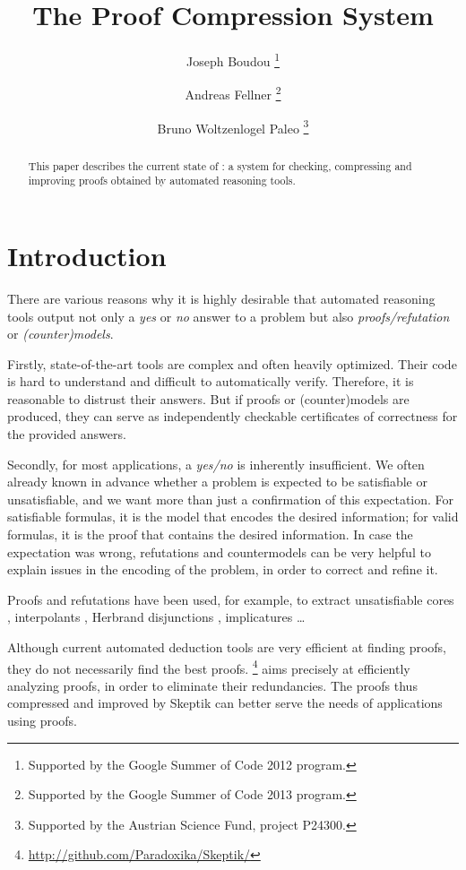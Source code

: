 \documentclass{llncs}
\title{The \skeptik Proof Compression System}
\author{
  Joseph Boudou\inst{1}
  \thanks{Supported by the Google Summer of Code 2012 program.}
  \and 
  Andreas Fellner\inst{2,3}
  \thanks{Supported by the Google Summer of Code 2013 program.}
  \and 
  Bruno Woltzenlogel Paleo\inst{3}
  \thanks{Supported by the Austrian Science Fund, project P24300.}
}
\institute{
  IRIT, Universit\'e de Toulouse, France \\
  \email{joseph.boudou@irit.fr}
  \and 
  Free University of Bolzano, Italy \\
  \email{fellner.a@gmail.com}
  \and 
  Vienna University of Technology, Austria \\
  \email{bruno@logic.at}
}
\begin{document}
\maketitle


\begin{abstract}
This paper describes the current state of \skeptik: a system for checking, compressing and improving proofs obtained by automated reasoning tools.
\end{abstract}

\setcounter{footnote}{0}


\section{Introduction}

There are various reasons why it is highly desirable 
that automated reasoning
tools output not only a \emph{yes} or \emph{no} answer to a problem 
but also \emph{proofs/refutation} or \emph{(counter)models}. 

Firstly, state-of-the-art tools are complex and often heavily optimized. 
Their code is hard to understand and difficult to automatically verify.
Therefore, it is reasonable to distrust their answers. 
But if proofs or (counter)models are produced, 
they can serve as independently checkable certificates of 
correctness for the provided answers. 

Secondly, for most applications, a \emph{yes/no} is inherently insufficient. We often already known in advance whether a problem is expected to be satisfiable or unsatisfiable, and we want more than just a confirmation of this expectation. For satisfiable formulas, it is the model that encodes the desired information; for valid formulas, it is the proof that contains the desired information. In case the expectation was wrong, refutations and countermodels can be very helpful to explain issues in the encoding of the problem, in order to correct and refine it.

Proofs and refutations have been used, for example, to extract unsatisfiable cores \cite{ToDo}, interpolants \cite{}, Herbrand disjunctions \cite{}, implicatures \cite{} \ldots

Although current automated deduction tools are very efficient at finding proofs, they do not necessarily find the best proofs. {\skeptik}\footnote{\url{http://github.com/Paradoxika/Skeptik/}} aims precisely at efficiently analyzing proofs, in order to eliminate their redundancies. The proofs thus compressed and improved by Skeptik can better serve the needs of applications using proofs.
\end{document}
